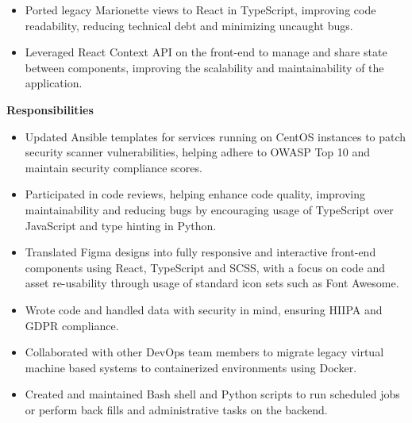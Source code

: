 \documentclass[11pt,a4paper,sans]{moderncv}        %
\begin{document}
{\begin{itemize}
\item Ported legacy Marionette views to React in TypeScript, improving code readability, reducing technical debt and minimizing uncaught bugs.
\item Leveraged React Context API on the front-end to manage and share state between components, improving the scalability and maintainability of the application.
   \end{itemize}
\textbf{Responsibilities}
	\begin{itemize}
\item Updated Ansible templates for services running on CentOS instances to patch security scanner vulnerabilities, helping adhere to OWASP Top 10 and maintain security compliance scores.
\item Participated in code reviews, helping enhance code quality, improving maintainability and reducing bugs by encouraging usage of TypeScript over JavaScript and type hinting in Python.
\item Translated Figma designs into fully responsive and interactive front-end components using React, TypeScript and SCSS, with a focus on code and asset re-usability through usage of standard icon sets such as Font Awesome.
\item Wrote code and handled data with security in mind, ensuring HIIPA and GDPR compliance.
\item Collaborated with other DevOps team members to migrate legacy virtual machine based systems to containerized environments using Docker.
\item Created and maintained Bash shell and Python scripts to run scheduled jobs or perform back fills and administrative tasks on the backend.
	\end{itemize}
}

\end{document}

